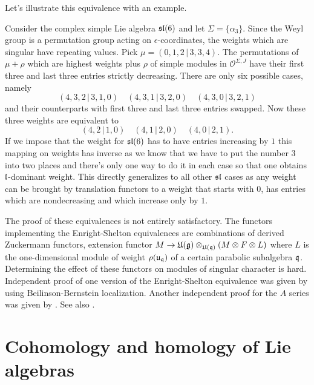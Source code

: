 Let's illustrate this equivalence with an example. 
\begin{example}
Consider the complex simple Lie algebra $\mathfrak{sl}(6)$ and let $\Sigma = \{\alpha_3\}$. Since the Weyl group is a permutation group acting on $\epsilon$-coordinates, the weights which are singular have repeating values. Pick $\mu = (0,1,2\, |\, 3,3,4)$. The permutations of $\mu + \rho$ which are highest weights plus $\rho$ of simple modules in $\mathcal{O}^{\Sigma, J}$ have their first three and last three entries strictly decreasing.  There are only six possible cases, namely
\[
(4, 3, 2\, |\, 3, 1, 0) \quad (4, 3, 1\, |\,3, 2, 0) \quad (4, 3, 0\, |\,3, 2, 1)
\]
and their counterparts with first three and last three entries swapped. Now these three weights are equivalent to 
\[
(4,  2\, |\,  1, 0) \quad (4,  1\, |\, 2, 0) \quad (4,  0\, |\, 2, 1).
\]
If we impose that the weight for $\mathfrak{sl}(6)$ has to have entries increasing by $1$ this mapping on weights has inverse as we know that we have to put the number $3$ into two places and there's only one way to do it in each case so that one obtains $\mathfrak{l}$-dominant weight. This directly generalizes to all other $\mathfrak{sl}$ cases as any weight can be brought by translation functors to a weight that starts with $0$, has entries which are nondecreasing and which increase only by $1$.
\end{example}

\begin{remark}
The proof of these equivalences is not entirely satisfactory. The functors implementing the Enright-Shelton equivalences are combinations of derived Zuckermann functors, extension functor $M \to \mathfrak{U(g)} \otimes_{\mathfrak{U(q)}} (M \otimes F \otimes L)$ where $L$ is the one-dimensional module of weight $\rho(\mathfrak{u_q})$ of a certain parabolic subalgebra $\mathfrak{q}$. Determining the effect of these functors on modules of singular character is hard. Independent proof of one version of the Enright-Shelton equivalence was given by \cite{soergel_mathscr_1988} using Beilinson-Bernstein localization. Another independent proof for the $A$ series was given by \cite{bernstein_categorification_1999}. See also \cite{pandzic_bgg_2016}.
\end{remark}

\section{Cohomology and homology of Lie algebras}

